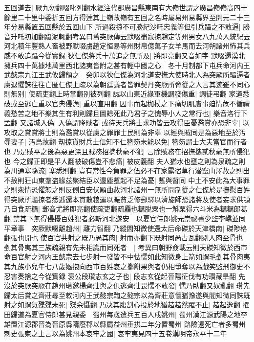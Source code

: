 五回道去|{
	厥九勿翻啜叱列翻水經注代郡廣昌縣東南有大嶺世謂之廣昌嶺嶺高四十餘里二十里中委折五回方得逹其上嶺故嶺有五回之名時屬易州易縣界至開元二十三年分易縣置五回縣於五回山下}
所過殺掠不可勝紀沙吒忠義等但引兵躡之不敢逼|{
	勝音升吒初加翻躡泥輒翻考異曰舊突厥傳云默啜盡寇掠趙定等州男女八九萬人統紀云河北積年豐熟人畜被野默啜虜趙定恒易等州財帛億萬子女羊馬而去河朔諸州怖其兵威不敢追躡今從實録}
狄仁傑將兵十萬追之無所及|{
	將即亮翻又音如字}
默啜還漠北擁兵四十萬據地萬里西北諸夷皆附之甚有輕中國之心　冬十月制都下屯兵命河内王武懿宗九江王武攸歸領之　癸卯以狄仁傑為河北道安撫大使時北人為突厥所驅逼者虜退懼誅往往亡匿仁傑上疏以為朝廷議者皆罪契丹突厥所脅從之人言其迹雖不同心則無别|{
	使疏吏翻上時掌翻别彼列翻}
誠以山東近緣軍機調發傷重|{
	調徒弔翻}
家道悉破或至逃亡重以官典侵漁|{
	重以直用翻}
因事而起枷杖之下痛切肌膚事廹情危不循禮義愁苦之地不樂其生有利則歸且圖賖死此乃君子之愧辱小人之常行也|{
	樂音洛行下孟翻}
又諸城入偽|{
	入偽謂降賊者}
或待天兵將士求功皆云攻得臣憂濫賞亦恐非辜|{
	以攻取之賞賞將士則為濫賞以從虜之罪罪士民則為非辜}
以經與賊同是為惡地至於汚辱妻子|{
	汚烏故翻}
刼掠貨財兵士信知不仁簪笏未能以免|{
	簪笏謂士大夫當官而行者也}
乃是賊平之後為惡更深且賊務招擕秋毫不犯|{
	言除賊務在招撫攜貳秋毫無所侵犯也}
今之歸正即是平人翻被破傷豈不悲痛|{
	被皮義翻}
夫人猶水也壅之則為泉疏之則為川通塞隨流|{
	塞悉則翻}
豈有常性今負罪之伍必不在家露宿草行潜竄山澤赦之則出不赦則狂山東羣盗緣兹聚結臣以邊塵蹔起不足為憂|{
	蹔與暫同}
中土不安此為大事罪之則衆情恐懼恕之則反側自安伏願曲赦河北諸州一無所問制從之仁傑於是撫慰百姓得突厥所驅掠者悉逓還本貫散粮運以賑貧乏修郵驛以濟旋師恐諸將及使者妄求供頓乃自食疏糲|{
	郵音尤將即亮翻使疏吏翻疏麤也糲脱粟也一斛粟得六斗米為糲糲郎葛翻}
禁其下無得侵擾百姓犯者必斬河北遂安　以夏官侍郎姚元崇祕書少監李嶠並同平章事　突厥默啜離趙州|{
	離力智翻}
乃縱閻知微使還太后命磔於天津橋南|{
	磔陟格翻張也開也}
使百官共射之既乃咼其肉|{
	射而亦翻下既射同咼古瓦翻剔人肉至骨也}
剉其骨夷其三族疏親有先未相識而同死者　|{
	考異曰朝野僉載云則天磔知微於西市命百官射之河内王懿宗去七步射一發皆不中怯懦如此知微身上箭如蝟毛剉其骨肉夷其九族小兒年七八歲嫗抱向西市百姓哀之擲餅果與者仍相爭奪以為戲笑監刑御史不忍害奏捨之今從實録}
褒公段瓚志玄之子也|{
	段志玄從起晉陽征伐有功瓚藏旱翻}
先沒於突厥突厥在趙州瓚邀楊齊莊與之俱逃齊莊畏懦不敢發|{
	懦乃臥翻又奴亂翻}
瓚先歸太后賞之齊莊尋至敕河内王武懿宗鞫之懿宗以為齊莊意懷猶豫遂與閻知微同誅既射之如蝟氣殜殜未死|{
	殜余懾翻}
乃决其腹割心投於地猶趌趌然躍不止|{
	趌起逸翻}
擢田歸道為夏官侍郎甚見親委　蜀州每歲遣兵五百人戍姚州|{
	蜀州漢江源武陽之地李雄置江源郡晉為晉原縣隋廢郡以縣屬益州垂拱二年分置蜀州}
路險遠死亡者多蜀州刺史張柬之上言以為姚州本哀牢之國|{
	哀牢夷見四十五卷漢明帝永平十二年}
